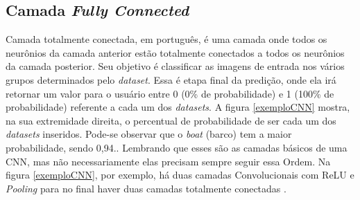 \subsection{Camada \textit{Fully Connected}}

Camada totalmente conectada, em português, é uma camada onde todos os neurônios da camada anterior estão totalmente conectados a todos os neurônios da camada posterior. Seu objetivo é classificar as imagens de entrada nos vários grupos determinados pelo \textit{dataset}. Essa é etapa final da predição, onde ela irá retornar um valor para o usuário entre 0 (0\% de probabilidade) e 1 (100\% de probabilidade) referente a cada um dos \textit{datasets}. A figura \ref{exemploCNN} mostra, na sua extremidade direita, o percentual de probabilidade de ser cada um dos \textit{datasets} inseridos. Pode-se observar que o \textit{boat} (barco) tem a maior probabilidade, sendo 0,94.\cite{conv2, aprendizadoDeMaquinaDivertido}. 
Lembrando que esses são as camadas básicos de uma CNN, mas não necessariamente elas precisam sempre seguir essa Ordem. Na figura \ref{exemploCNN}, por exemplo, há duas camadas Convolucionais com ReLU e \textit{Pooling} para no final haver duas camadas totalmente conectadas \cite{conv2}.

\begin{figure}[H]
	\centering
\end{figure}